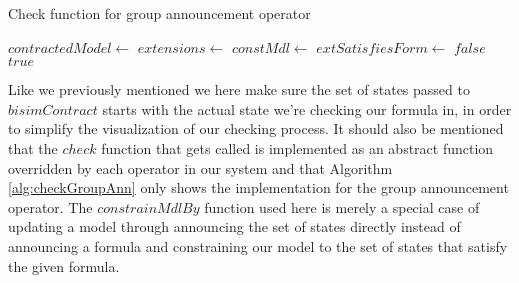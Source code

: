 \begin{algorithm}
	\caption{Check function for group announcement operator}
	\label{alg:checkGroupAnn}
	\begin{algorithmic}	
		\State $contractedModel \gets$ 
		\State $extensions \gets $
			\State $constMdl \gets$ 
			\State $extSatisfiesForm \gets $ 
				\State \Return $false$
			\EndIf
		\EndFor
		\State \Return $true$
		\EndFunction
	\end{algorithmic}
\end{algorithm}

Like we previously mentioned we here make sure the set of states passed to $bisimContract$ starts with the actual state we're checking our formula in, in order to simplify the visualization of our checking process. It should also be mentioned that the $check$ function that gets called is implemented as an abstract function overridden by each operator in our system and that Algorithm \ref{alg:checkGroupAnn} only shows the implementation for the group announcement operator. The $constrainMdlBy$ function used here is merely a special case of updating a model through announcing the set of states directly instead of announcing a formula and constraining our model to the set of states that satisfy the given formula. 

